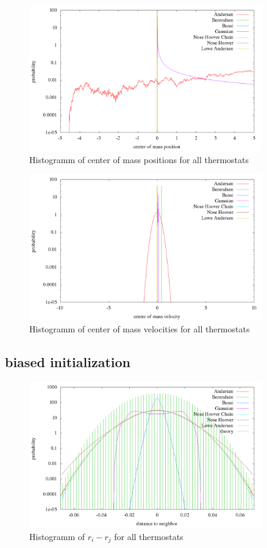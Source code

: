 \begin{figure}[H]
\centering
\includegraphics[width=0.9\textwidth]{./graphics/Histogramm_schwerPos_rand_T=20_p=64.png}
\caption{Histogramm of center of mass positions for all thermostats}
\label{im:schwerPos_rand}
\end{figure} 

\begin{figure}[H]
\centering
\includegraphics[width=0.9\textwidth]{./graphics/Histogramm_schwerVel_rand_T=20_p=64.png}
\caption{Histogramm of center of mass velocities for all thermostats}
\label{im:schwerVel_rand}
\end{figure} 


\subsection{biased initialization}
\begin{figure}[H]
\centering
\includegraphics[width=0.9\textwidth]{./graphics/Histogramm_relPos_one_T=20_p=64.png}
\caption{Histogramm of $r_i - r_j$ for all thermostats}
\label{im:relPos_one}
\end{figure} 

